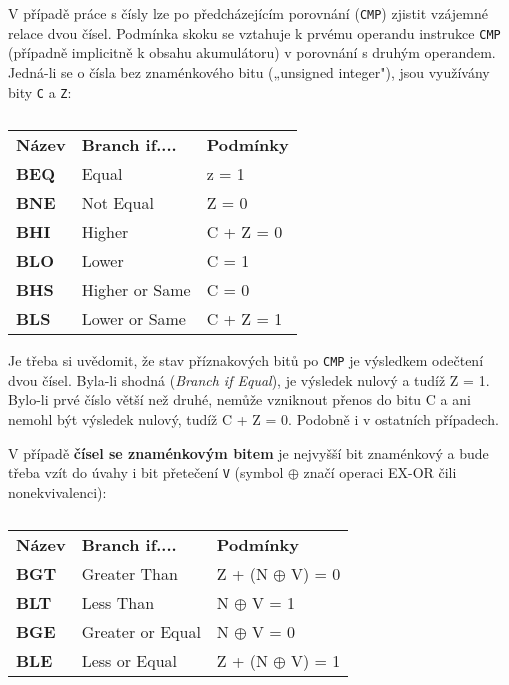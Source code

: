       V případě práce s čísly lze po předcházejícím porovnání (\texttt{CMP}) zjistit vzájemné relace
      dvou čísel. Podmínka skoku se vztahuje k prvému operandu instrukce \texttt{CMP} (případně
      implicitně k obsahu akumulátoru) v porovnání s druhým operandem. Jedná-li se o čísla bez
      znaménkového bitu („unsigned integer"), jsou využívány bity \texttt{C} a \texttt{Z}:
      
      \begin{table}[ht!]
        \renewcommand\arraystretch{1.0}
        \begin{tabular}{lll}
          \textbf{Název} & \textbf{Branch if....}  & \textbf{Podmínky}   \\ \cline{1-3}
          \textbf{BEQ}   & Equal                   & z = 1               \\
          \textbf{BNE}   & Not Equal               & Z = 0               \\
          \textbf{BHI}   & Higher                  & C + Z = 0           \\
          \textbf{BLO}   & Lower                   & C = 1               \\
          \textbf{BHS}   & Higher or Same          & C = 0               \\
          \textbf{BLS}   & Lower or Same           & C + Z = 1           \\
        \end{tabular}
        \caption*{ }
      \end{table}
      
      Je třeba si uvědomit, že stav příznakových bitů po \texttt{CMP} je výsledkem odečtení dvou 
      čísel. Byla-li shodná (\emph{Branch if Equal}), je výsledek nulový a tudíž Z = 1. Bylo-li 
      prvé číslo větší než druhé, nemůže vzniknout přenos do bitu C a ani nemohl být výsledek 
      nulový, tudíž C + Z = 0. Podobně i v ostatních případech.
      
      V případě \textbf{čísel se znaménkovým bitem} je nejvyšší bit znaménkový a bude třeba vzít do 
      úvahy i bit přetečení \texttt{V} (symbol \(\oplus\) značí operaci EX-OR čili nonekvivalenci):
      
      \begin{table}[ht!]
        \renewcommand\arraystretch{1.0}
        \begin{tabular}{lll}
          \textbf{Název} & \textbf{Branch if....}  & \textbf{Podmínky}          \\ \cline{1-3}
          \textbf{BGT}   & Greater Than            & Z + (N \(\oplus\) V) = 0   \\
          \textbf{BLT}   & Less Than               & N \(\oplus\) V = 1         \\
          \textbf{BGE}   & Greater or Equal        & N \(\oplus\) V = 0         \\
          \textbf{BLE}   & Less or Equal           & Z + (N \(\oplus\) V) = 1   \\
        \end{tabular}
        \caption*{ }
      \end{table}

